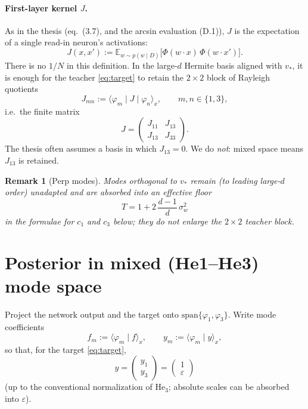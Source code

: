 \documentclass[11pt,a4paper]{article}
\newtheorem{remark}{Remark}
\begin{document}
\paragraph{First-layer kernel $J$.}
As in the thesis (eq.~(3.7), and the arcsin evaluation (D.1)), $J$ is the
expectation of a single read-in neuron's activations:
\begin{equation}
  J(x,x')
  :=
  \mathbb{E}_{w\sim p(w\mid D)}
  \bigl[
    \Phi(w\cdot x)\,
    \Phi(w\cdot x')
  \bigr].
  \label{eq:J-op}
\end{equation}
There is no $1/N$ in this definition.
In the large-$d$ Hermite basis aligned with $v_\ast$, it is enough for the teacher
\eqref{eq:target} to retain the $2\times 2$ block of Rayleigh quotients
\begin{equation}
  J_{mn}
  :=
  \langle \varphi_m \mid J \mid \varphi_n\rangle_x,
  \qquad
  m,n\in\{1,3\},
\end{equation}
i.e.\ the finite matrix
\begin{equation}
  J
  =
  \begin{pmatrix}
    J_{11} & J_{13}\\
    J_{13} & J_{33}
  \end{pmatrix}.
  \label{eq:J-matrix}
\end{equation}
The thesis often assumes a basis in which $J_{13}=0$.
We do \emph{not}: mixed space means $J_{13}$ is retained.

\begin{remark}[Perp modes]
Modes orthogonal to $v_\ast$ remain (to leading large-$d$ order) unadapted and are
absorbed into an effective floor
\begin{equation}
  T
  =
  1
  +
  2\,\frac{d-1}{d}\,\sigma_w^2
\end{equation}
in the formulae for $c_1$ and $c_3$ below; they do not enlarge the $2\times 2$ teacher block.
\end{remark}

\section{Posterior in mixed (He1--He3) mode space}

Project the network output and the target onto
$\mathrm{span}\{\varphi_1,\varphi_3\}$.
Write mode coefficients
\begin{equation}
  f_m := \langle \varphi_m\mid f\rangle_x,
  \qquad
  y_m := \langle \varphi_m\mid y\rangle_x,
\end{equation}
so that, for the target \eqref{eq:target},
\begin{equation}
  y
  =
  \begin{pmatrix} y_1\\ y_3\end{pmatrix}
  =
  \begin{pmatrix} 1\\ \varepsilon\end{pmatrix}
  \label{eq:y-vec}
\end{equation}
(up to the conventional normalization of $\mathrm{He}_3$; absolute scales can be
absorbed into $\varepsilon$).
\end{document}
